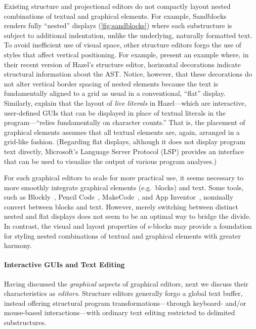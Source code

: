 \documentclass[acmsmall, screen]{acmart}
\newcommand{\parahead}[1]
  {\paragraph{\textbf{#1}}}
\begin{document}
Existing structure and projectional editors do not compactly layout nested combinations of textual and graphical elements.
For example, Sandblocks~\citep{Beckmann2023} renders fully ``nested'' displays (\autoref{fig:sandblocks}) where each substructure is subject to additional indentation, unlike the underlying, naturally formatted text.
To avoid inefficient use of visual space, other structure editors forgo the use of styles that affect vertical positioning.
For example, \citet[Fig.~5]{TeenTylr} present an example where, in their recent version of Hazel's structure editor, horizontal decorations indicate structural information about the AST. Notice, however, that these decorations do not alter vertical border spacing of nested elements because the text is fundamentally aligned to a grid as usual in a conventional, ``flat'' display.
Similarly, \citet[Sec.~5.3]{Omar2021} explain that the layout of \emph{live literals} in Hazel---which are interactive, user-defined GUIs that can be displayed in place of textual literals in the program---``relies fundamentally on character counts.''
That is, the placement of graphical elements assumes that all textual elements are, again, arranged in a grid-like fashion.
(Regarding flat displays, although it does not display program text directly, Microsoft's Language Server Protocol (LSP) \cite{LSP} provides an interface that can be used to visualize the output of various program analyses.)




For such graphical editors to scale for more practical use, it seems necessary to more smoothly integrate graphical elements (e.g.~blocks) and text.
Some tools, such as Blockly~\citep{Blockly}, Pencil Code~\citep{PencilCode, Droplet}, MakeCode~\citep{MakeCode}, and App Inventor~\citep{AppInventorBlocks1, AppInventorBlocks2}, nominally convert between blocks and text. However, merely switching between distinct nested and flat displays does not seem to be an optimal way to bridge the divide.
In contrast, the visual and layout properties of s-blocks may provide a foundation for styling nested combinations of textual and graphical elements with greater harmony.






\parahead{Interactive GUIs and Text Editing}

Having discussed the \emph{graphical} aspects of graphical editors, next we discuss their characteristics as \emph{editors}.
Structure editors generally forgo a global text buffer, instead offering structural program transformations---through keyboard- and/or mouse-based interactions---with ordinary text editing restricted to delimited substructures.
\end{document}

